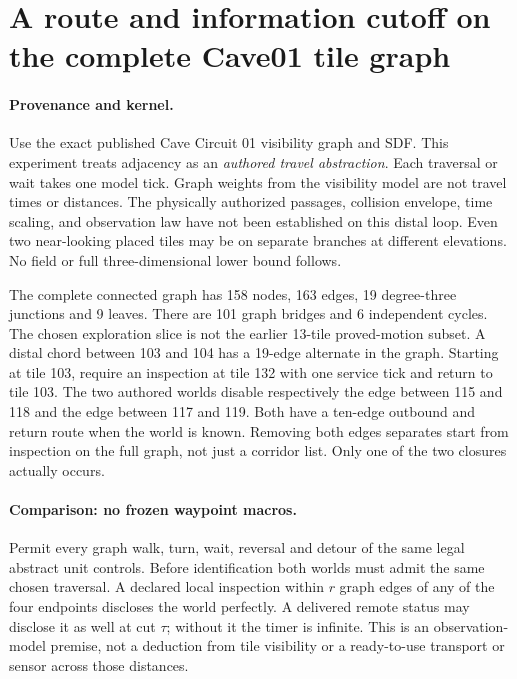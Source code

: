 \documentclass{article}
\begin{document}
\section*{A route and information cutoff on the complete Cave01 tile graph}
\paragraph{Provenance and kernel.}
Use the exact published Cave Circuit 01 visibility graph and SDF.
This experiment treats adjacency as an \emph{authored travel
abstraction}. Each traversal or wait takes one model tick.
Graph weights from the visibility model are not travel times or
distances. The physically authorized passages, collision envelope,
time scaling, and observation law have not been established on
this distal loop. Even two near-looking placed tiles may be on
separate branches at different elevations. No field or full
three-dimensional lower bound follows.

The complete connected graph has 158 nodes, 163 edges,
19 degree-three junctions and 9 leaves. There are 101 graph
bridges and 6 independent cycles. The chosen exploration slice
is not the earlier 13-tile proved-motion subset. A distal chord
between 103 and 104 has a 19-edge alternate in the graph.
Starting at tile 103, require an inspection at tile 132 with one
service tick and return to tile 103. The two authored worlds
disable respectively the edge between 115 and 118 and the edge
between 117 and 119. Both have a ten-edge outbound and return
route when the world is known. Removing both edges separates
start from inspection on the full graph, not just a corridor
list. Only one of the two closures actually occurs.

\paragraph{Comparison: no frozen waypoint macros.}
Permit every graph walk, turn, wait, reversal and detour of the
same legal abstract unit controls. Before identification both worlds
must admit the same chosen traversal. A declared local inspection
within $r$ graph edges of any of the four endpoints discloses the
world perfectly. A delivered remote status may disclose it as
well at cut $\tau$; without it the timer is infinite. This is an
observation-model premise, not a deduction from tile visibility or
a ready-to-use transport or sensor across those distances.
\end{document}
